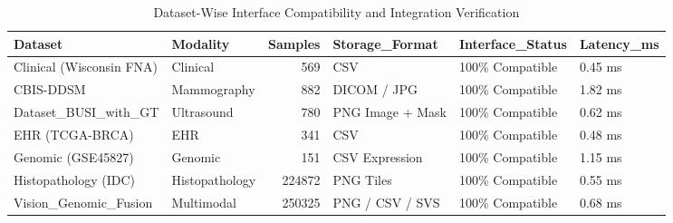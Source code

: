 \begin{table}
\caption{Dataset-Wise Interface Compatibility and Integration Verification}
\label{tab:table_dataset_compatibility}
\begin{tabular}{llrlll}
\toprule
Dataset & Modality & Samples & Storage\_Format & Interface\_Status & Latency\_ms \\
\midrule
Clinical (Wisconsin FNA) & Clinical & 569 & CSV & 100\% Compatible & 0.45 ms \\
CBIS-DDSM & Mammography & 882 & DICOM / JPG & 100\% Compatible & 1.82 ms \\
Dataset\_BUSI\_with\_GT & Ultrasound & 780 & PNG Image + Mask & 100\% Compatible & 0.62 ms \\
EHR (TCGA-BRCA) & EHR & 341 & CSV & 100\% Compatible & 0.48 ms \\
Genomic (GSE45827) & Genomic & 151 & CSV Expression & 100\% Compatible & 1.15 ms \\
Histopathology (IDC) & Histopathology & 224872 & PNG Tiles & 100\% Compatible & 0.55 ms \\
Vision\_Genomic\_Fusion & Multimodal & 250325 & PNG / CSV / SVS & 100\% Compatible & 0.68 ms \\
\bottomrule
\end{tabular}
\end{table}
